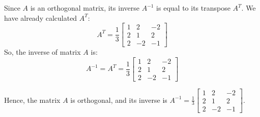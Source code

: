 \documentclass{article}
\begin{document}
Since $A$ is an orthogonal matrix, its inverse $A^{-1}$ is equal to its transpose $A^T$.
We have already calculated $A^T$:
\[ A^T = \frac{1}{3} \begin{bmatrix} 1 & 2 & -2 \\ 2 & 1 & 2 \\ 2 & -2 & -1 \end{bmatrix} \]
So, the inverse of matrix $A$ is:
\[ A^{-1} = A^T = \frac{1}{3} \begin{bmatrix} 1 & 2 & -2 \\ 2 & 1 & 2 \\ 2 & -2 & -1 \end{bmatrix} \]

Hence, the matrix $A$ is orthogonal, and its inverse is $A^{-1} = \frac{1}{3} \begin{bmatrix} 1 & 2 & -2 \\ 2 & 1 & 2 \\ 2 & -2 & -1 \end{bmatrix}$.
\end{document}
